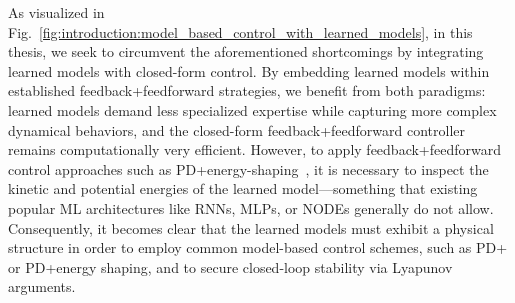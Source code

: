 As visualized in Fig.~\ref{fig:introduction:model_based_control_with_learned_models}, in this thesis, we seek to circumvent the aforementioned shortcomings by integrating learned models with closed-form control. By embedding learned models within established feedback+feedforward strategies, we benefit from both paradigms: learned models demand less specialized expertise while capturing more complex dynamical behaviors, and the closed-form feedback+feedforward controller remains computationally very efficient. However, to apply feedback+feedforward control approaches such as PD+energy-shaping~\cite{della2023model, caasenbrood2023control}, it is necessary to inspect the kinetic and potential energies of the learned model—something that existing popular \gls{ML} architectures like \glspl{RNN}, \glspl{MLP}, or \glspl{NODE} generally do not allow. Consequently, it becomes clear that the learned models must exhibit a physical structure in order to employ common model-based control schemes, such as PD+ or PD+energy shaping, and to secure closed-loop stability via Lyapunov arguments.

